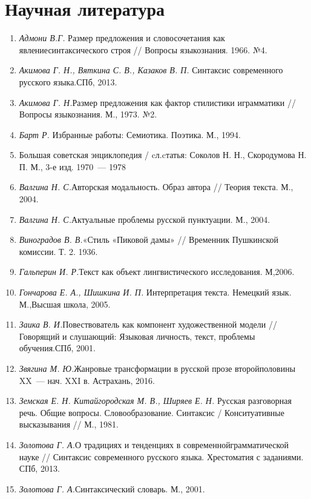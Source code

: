     \section*{Научная литература}
      \begin{enumerate}
        \item \textit{Адмони В.Г.} Размер предложения и словосочетания как явлениесинтаксического строя // Вопросы языкознания.  1966. №4. 
        \item \textit{Акимова Г. Н., Вяткина С. В., Казаков В. П. }Синтаксис современного русского языка.СПб, 2013. 
        \item \textit{Акимова Г. Н.}Размер предложения как фактор стилистики играмматики // Вопросы языкознания. М., 1973. №2.
        \item \textit{Барт Р.} Избранные работы: Семиотика. Поэтика. М., 1994.
        \item Большая советская энциклопедия / cл.cтатья: Соколов Н. Н., Скородумова Н. П. М., 3-е изд. 1970~--- 1978
        \item \textit{Валгина Н. С.}Авторская модальность. Образ автора // Теория текста. М., 2004. 
        \item \textit{Валгина Н. С.}Актуальные проблемы русской пунктуации. М., 2004.
        \item \textit{Виноградов В. В.}«Стиль «Пиковой дамы» // Временник Пушкинской комиссии. Т. 2. 1936. 
        \item \textit{Гальперин И. Р.}Текст как объект лингвистического исследования. М,2006. 
        \item \textit{Гончарова Е. А., Шишкина И. П. }Интерпретация текста. Немецкий язык. М.,Высшая школа, 2005.
        \item \textit{Заика В. И.}Повествователь как компонент художественной модели // Говорящий и слушающий: Языковая личность, текст, проблемы обучения.СПб, 2001.
        \item \textit{Звягина М. Ю.}Жанровые трансформации в русской прозе второйполовины XX~--- нач. XXI в. Астрахань, 2016.
        \item \textit{Земская Е. Н. Китайгородская М. В., Ширяев Е. Н. }Русская разговорная речь. Общие вопросы. Словообразование. Синтаксис / Конситуативные высказывания // М., 1981.
        \item \textit{Золотова Г. А.}О традициях и тенденциях в современнойграмматической науке // Синтаксис современного русского языка. Хрестоматия с заданиями. СПб, 2013. 
        \item \textit{Золотова Г. А.}Синтаксический словарь. М., 2001.

\end{enumerate}
